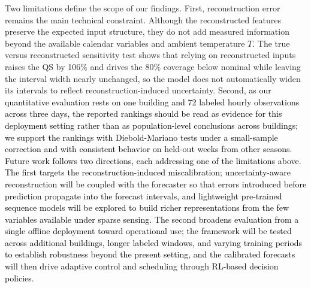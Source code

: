 \documentclass[final,10pt,1p,authoryear]{elsarticle}
\theoremstyle{definition}
\begin{document}
Two limitations define the scope of our findings. First, reconstruction error remains the main technical constraint. Although the reconstructed features preserve the expected input structure, they do not add measured information beyond the available calendar variables and ambient temperature $T$. The true versus reconstructed sensitivity test shows that relying on reconstructed inputs raises the QS by 106\% and drives the 80\% coverage below nominal while leaving the interval width nearly unchanged, so the model does not automatically widen its intervals to reflect reconstruction-induced uncertainty. \textcolor{black}{Second, as our quantitative evaluation rests on one building and 72 labeled hourly observations across three days, the reported rankings should be read as evidence for this deployment setting rather than as population-level conclusions across buildings; we support the rankings with Diebold-Mariano tests under a small-sample correction and with consistent behavior on held-out weeks from other seasons. Future work follows two directions, each addressing one of the limitations above. The first targets the reconstruction-induced miscalibration; uncertainty-aware reconstruction will be coupled with the forecaster so that errors introduced before prediction propagate into the forecast intervals, and lightweight pre-trained sequence models will be explored to build richer representations from the few variables available under sparse sensing. The second broadens evaluation from a single offline deployment toward operational use; the framework will be tested across additional buildings, longer labeled windows, and varying training periods to establish robustness beyond the present setting, and the calibrated forecasts will then drive adaptive control and scheduling through RL-based decision policies.}



\end{document}

